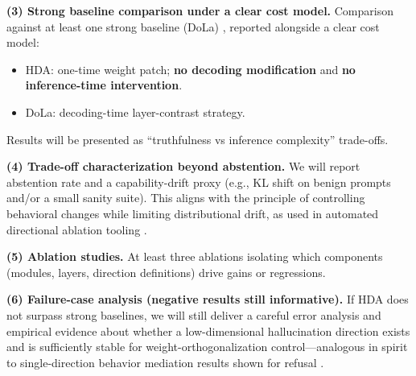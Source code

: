 \textbf{(3) Strong baseline comparison under a clear cost model.}
Comparison against at least one strong baseline (DoLa) \citep{chuang2024dola}, reported alongside a clear cost model:
\begin{itemize}
  \item HDA: one-time weight patch; \textbf{no decoding modification} and \textbf{no inference-time intervention}.
  \item DoLa: decoding-time layer-contrast strategy.
\end{itemize}
Results will be presented as “truthfulness vs inference complexity” trade-offs.

\textbf{(4) Trade-off characterization beyond abstention.}
We will report abstention rate and a capability-drift proxy (e.g., KL shift on benign prompts and/or a small sanity suite). This aligns with the principle of controlling behavioral changes while limiting distributional drift, as used in automated directional ablation tooling \citep{heretic}.

\textbf{(5) Ablation studies.}
At least three ablations isolating which components (modules, layers, direction definitions) drive gains or regressions.

\textbf{(6) Failure-case analysis (negative results still informative).}
If HDA does not surpass strong baselines, we will still deliver a careful error analysis and empirical evidence about whether a low-dimensional hallucination direction exists and is sufficiently stable for weight-orthogonalization control—analogous in spirit to single-direction behavior mediation results shown for refusal \citep{arditi2024refusal}.




